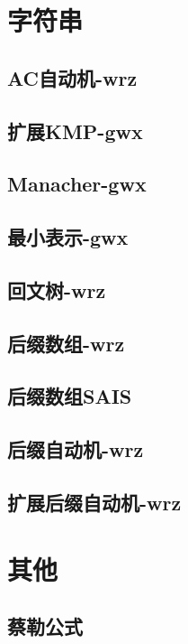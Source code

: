 \documentclass[titlepage,a4paper,10pt]{article}
\begin{document}
\begin{multicols}{2}
\begin{spacing}{0.8}
		\section{字符串}
			\subsection{AC自动机-wrz}
				
			\subsection{扩展KMP-gwx}
				
			\subsection{Manacher-gwx}
				
			\subsection{最小表示-gwx}
				
			\subsection{回文树-wrz}
				
			\subsection{后缀数组-wrz}
				
			\subsection{后缀数组SAIS}
				
			\subsection{后缀自动机-wrz}
				
			\subsection{扩展后缀自动机-wrz}
				
		\section{其他}
			\subsection{蔡勒公式}
				

\end{spacing}
\end{multicols}
\end{document}
